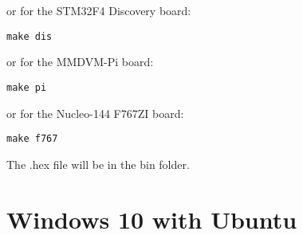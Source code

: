 \documentclass[]{article}
\begin{document}
\begin{itemize}[leftmargin=*]
or for the STM32F4 Discovery board:
\begin{lstlisting}[style=DOS]
make dis
\end{lstlisting}

or for the MMDVM-Pi board:
\begin{lstlisting}[style=DOS]
make pi
\end{lstlisting}

or for the Nucleo-144 F767ZI board:
\begin{lstlisting}[style=DOS]
make f767
\end{lstlisting}

The .hex file will be in the bin folder.

\end{itemize}

\section{Windows 10 with Ubuntu}
\end{document}
